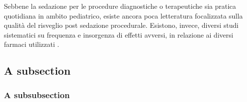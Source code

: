 Sebbene la sedazione per le procedure diagnostiche o terapeutiche sia pratica quotidiana in ambito pediatrico, esiste ancora poca letteratura focalizzata sulla qualità del risveglio post sedazione procedurale. Esistono, invece, diversi studi sistematici su frequenza e insorgenza di effetti avversi, in relazione ai diversi farmaci utilizzati \citep{Bellolio2016}. 

\subsection{A subsection}

\lipsum[3]

\subsubsection{A subsubsection}

\lipsum[4]